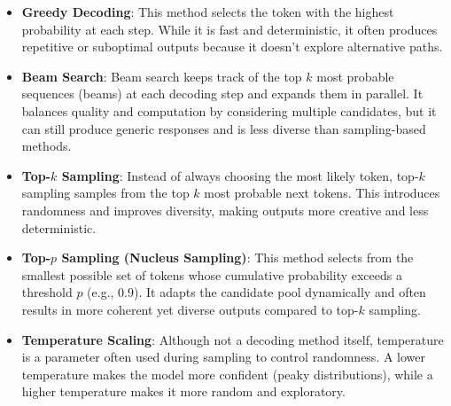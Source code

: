 \documentclass[11pt]{article}
\begin{document}
\begin{itemize}
	\item \textbf{Greedy Decoding}: This method selects the token with the highest probability at each step. While it is fast and deterministic, it often produces repetitive or suboptimal outputs because it doesn't explore alternative paths.
	\item \textbf{Beam Search}: Beam search keeps track of the top \(k\) most probable sequences (beams) at each decoding step and expands them in parallel. It balances quality and computation by considering multiple candidates, but it can still produce generic responses and is less diverse than sampling-based methods.
	\item \textbf{Top-\(k\) Sampling}: Instead of always choosing the most likely token, top-\(k\) sampling samples from the top \(k\) most probable next tokens. This introduces randomness and improves diversity, making outputs more creative and less deterministic.
	\item \textbf{Top-\(p\) Sampling (Nucleus Sampling)}: This method selects from the smallest possible set of tokens whose cumulative probability exceeds a threshold \(p\) (e.g., 0.9). It adapts the candidate pool dynamically and often results in more coherent yet diverse outputs compared to top-\(k\) sampling.
	\item \textbf{Temperature Scaling}: Although not a decoding method itself, temperature is a parameter often used during sampling to control randomness. A lower temperature makes the model more confident (peaky distributions), while a higher temperature makes it more random and exploratory.
\end{itemize}
\end{document}
